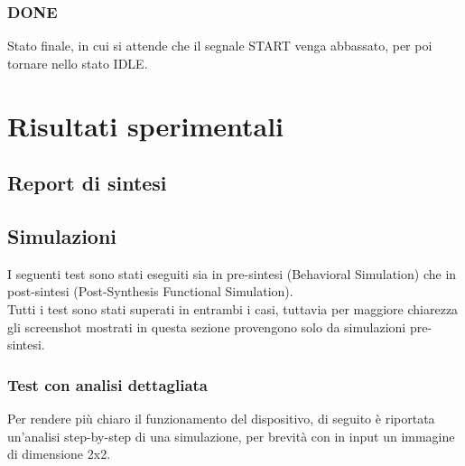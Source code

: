 \documentclass[a4paper, 12pt]{article}
\begin{document}
\subsubsection{DONE}
Stato finale, in cui si attende che il segnale START venga abbassato, per poi tornare nello stato IDLE. 

\newpage
\section{Risultati sperimentali}
\subsection{Report di sintesi}

\vspace{5cm}

\subsection{Simulazioni}
I seguenti test sono stati eseguiti sia in pre-sintesi (Behavioral Simulation) che in post-sintesi (Post-Synthesis Functional Simulation).\\
Tutti i test sono stati superati in entrambi i casi, tuttavia per maggiore chiarezza gli screenshot mostrati in questa sezione provengono solo da simulazioni pre-sintesi.

\subsubsection{Test con analisi dettagliata}
Per rendere più chiaro il funzionamento del dispositivo, di seguito è riportata un'analisi step-by-step di una simulazione, per brevità con in input un immagine di dimensione 2x2.
\end{document}
